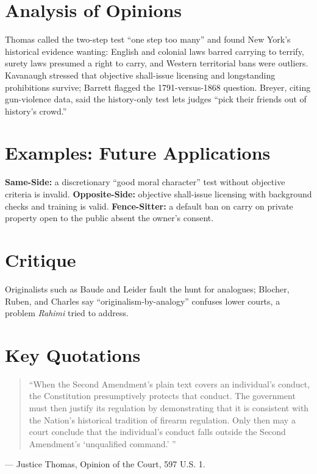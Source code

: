 \documentclass[12pt]{article}
\begin{document}
\section{Analysis of Opinions}
Thomas called the two-step test ``one step too many'' and found New York's historical evidence wanting: English and colonial laws barred carrying to terrify, surety laws presumed a right to carry, and Western territorial bans were outliers. Kavanaugh stressed that objective shall-issue licensing and longstanding prohibitions survive; Barrett flagged the 1791-versus-1868 question. Breyer, citing gun-violence data, said the history-only test lets judges ``pick their friends out of history's crowd.''

\section{Examples: Future Applications}
\textbf{Same-Side:} a discretionary ``good moral character'' test without objective criteria is invalid. \textbf{Opposite-Side:} objective shall-issue licensing with background checks and training is valid. \textbf{Fence-Sitter:} a default ban on carry on private property open to the public absent the owner's consent.

\section{Critique}
Originalists such as Baude and Leider fault the hunt for analogues; Blocher, Ruben, and Charles say ``originalism-by-analogy'' confuses lower courts, a problem \textit{Rahimi} tried to address.

\section{Key Quotations}
\begin{quote}
``When the Second Amendment's plain text covers an individual's conduct, the Constitution presumptively protects that conduct. The government must then justify its regulation by demonstrating that it is consistent with the Nation's historical tradition of firearm regulation. Only then may a court conclude that the individual's conduct falls outside the Second Amendment's `unqualified command.' ''
\end{quote}
\noindent --- Justice Thomas, Opinion of the Court, 597 U.S. 1.
\end{document}
